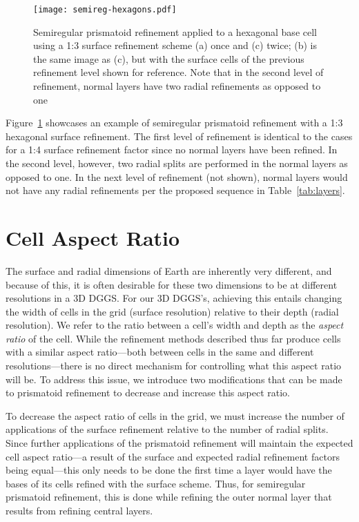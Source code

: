 \begin{figure}[ht!]
	\centering
	\texttt{[image: semireg-hexagons.pdf]}
	\caption[Semiregular prismatoid refinement for hexagons]{
		Semiregular prismatoid refinement applied to a hexagonal base cell using a 1:3 surface refinement scheme (a) once and (c) twice; (b) is the same image as (c), but with the surface cells of the previous refinement level shown for reference.
		Note that in the second level of refinement, normal layers have two radial refinements as opposed to one
	}
	\label{fig:hexagons}
\end{figure}


Figure~\ref{fig:hexagons} showcases an example of semiregular prismatoid refinement with a 1:3 hexagonal surface refinement.
The first level of refinement is identical to the cases for a 1:4 surface refinement factor since no normal layers have been refined.
In the second level, however, two radial splits are performed in the normal layers as opposed to one.
In the next level of refinement (not shown), normal layers would not have any radial refinements per the proposed sequence in Table~\ref{tab:layers}.


\section{Cell Aspect Ratio} \label{chap:5:ar}
The surface and radial dimensions of Earth are inherently very different, and because of this, it is often desirable for these two dimensions to be at different resolutions in a 3D DGGS.
For our 3D DGGS's, achieving this entails changing the width of cells in the grid (surface resolution) relative to their depth (radial resolution).
We refer to the ratio between a cell's width and depth as the \textit{aspect ratio} of the cell.
While the refinement methods described thus far produce cells with a similar aspect ratio---both between cells in the same and different resolutions---there is no direct mechanism for controlling what this aspect ratio will be.
To address this issue, we introduce two modifications that can be made to prismatoid refinement to decrease and increase this aspect ratio.


To decrease the aspect ratio of cells in the grid, we must increase the number of applications of the surface refinement relative to the number of radial splits.
Since further applications of the prismatoid refinement will maintain the expected cell aspect ratio---a result of the surface and expected radial refinement factors being equal---this only needs to be done the first time a layer would have the bases of its cells refined with the surface scheme.
Thus, for semiregular prismatoid refinement, this is done while refining the outer normal layer that results from refining central layers.


